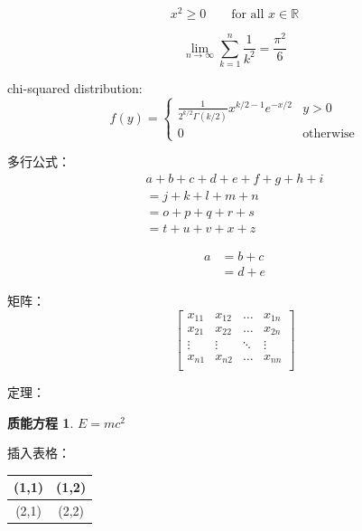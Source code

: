 \documentclass[12pt,hyperref,a4paper,UTF8]{ctexart}
\begin{document}
\begin{equation}\label{eq:3}
    x^2 \geq 0 \qquad \text{for all } x \in \mathbb{R}
\end{equation}

\begin{equation}\label{eq:4}
    \lim_{n \to \infty}
    \sum_{k=1}^n \frac{1}{k^2}
    = \frac{\pi^2}{6}
\end{equation}

chi-squared distribution:
\begin{equation}\label{eq:5}
    f(y) =
    \begin{cases}
        \frac{1}{2^{k/2}\Gamma(k/2)} x^{k/2-1} e^{-x/2} & y>0              \\
        0                                               & \text{otherwise}
    \end{cases}
\end{equation}

多行公式：
\begin{multline} \label{eq:6}
    a + b + c + d + e + f
    + g + h + i \\
    = j + k + l + m + n\\
    = o + p + q + r + s\\
    = t + u + v + x + z
\end{multline}

\begin{align} \label{eq:7}
    a & = b + c \\
      & = d + e
\end{align}

矩阵：
\begin{equation} \label{eq:8}
    \begin{bmatrix}
        x_{11} & x_{12} & \ldots & x_{1n} \\
        x_{21} & x_{22} & \ldots & x_{2n} \\
        \vdots & \vdots & \ddots & \vdots \\
        x_{n1} & x_{n2} & \ldots & x_{nn} \\
    \end{bmatrix}
\end{equation}

定理：
\newtheorem{mass-energy equivalence}{质能方程}[section]
\begin{mass-energy equivalence} \label{thm:1}
$E = mc^2$
\end{mass-energy equivalence}

插入表格：
\begin{table}[h]
    \begin{tabular}{|c|c|}%
        \hline  %
        (1,1) & (1,2) \\
        \hline  %
        (2,1) & (2,2) \\
        \hline %
    \end{tabular}
\end{table}
\end{document}
